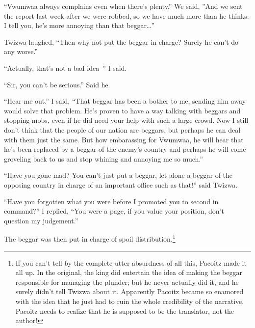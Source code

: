 ``Vwu\-mwaa always complains even when there's plenty.'' We said, ''And we sent the report last week after we were robbed, so we have much more than he thinks. I tell you, he's more annoying than that beggar\ldots''

Twi\-zwa laughed, ``Then why not put the beggar in charge? Surely he can't do any worse.''

``Actually, that's not a bad idea--'' I said.

``Sir, you can't be serious.'' Said he.

``Hear me out.'' I said, ``That beggar has been a bother to me, sending him away would solve that problem. He's proven to have a way talking with beggars and stopping mobs, even if he did need your help with such a large crowd. Now I still don't think that the people of our nation are beggars, but perhaps he can deal with them just the same. But how embarassing for Vwu\-mwaa, he will hear that he's been replaced by a beggar of the enemy's country and perhaps he will come groveling back to us and stop whining and annoying me so much.''

``Have you gone mad? You can't just put a beggar, let alone a beggar of the opposing country in charge of an important office such as that!'' said Twi\-zwa.

``Have you forgotten what you were before I promoted you to second in command?'' I replied, ``You were a page, if you value your position, don't question my judgement.''

The beggar was then put in charge of spoil distribution.\footnote{If you can't tell by the complete utter absurdness of all this, Pa\-co\-itz made it all up. In the original, the king did entertain the idea of making the beggar responsible for managing the plunder; but he never actually did it, and he surely didn't tell Twi\-zwa about it. Apparently Pa\-co\-itz became so enamored with the idea that he just had to ruin the whole credibility of the narrative.
Pa\-co\-itz needs to realize that he is supposed to be the translator, not the author!}
